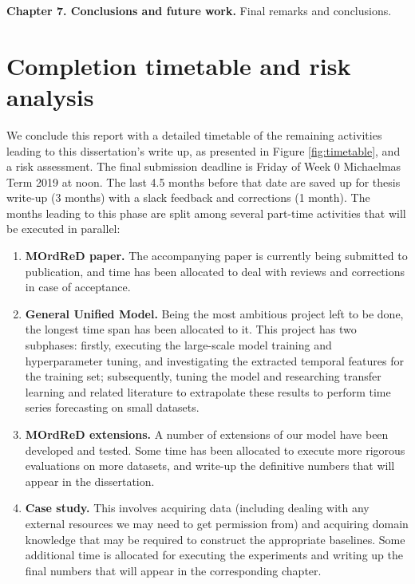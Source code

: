 \documentclass[pdftex,12pt,a4paper]{article}
\theoremstyle{definition}
\theoremstyle{remark}
\begin{document}
\textbf{Chapter 7. Conclusions and future work.} Final remarks and conclusions. 

\section{Completion timetable and risk analysis}
We conclude this report with a detailed timetable of the remaining activities leading to this dissertation's write up, as presented in Figure \ref{fig:timetable}, and a risk assessment. The final submission deadline is Friday of Week 0 Michaelmas Term 2019 at noon. The last 4.5 months before that date are saved up for thesis write-up (3 months) with a slack feedback and corrections (1 month). The months leading to this phase are split among several part-time activities that will be executed in parallel:

\begin{enumerate}
    \item \textbf{MOrdReD paper.} The accompanying paper is currently being submitted to publication, and time has been allocated to deal with reviews and corrections in case of acceptance.
    \item \textbf{General Unified Model.} Being the most ambitious project left to be done, the longest time span has been allocated to it. This project has two subphases: firstly, executing the large-scale model training and hyperparameter tuning, and investigating the extracted temporal features for the training set; subsequently, tuning the model and researching transfer learning and related literature to extrapolate these results to perform time series forecasting on small datasets.
    \item \textbf{MOrdReD extensions.} A number of extensions of our model have been developed and tested. Some time has been allocated to execute more rigorous evaluations on more datasets, and write-up the definitive numbers that will appear in the dissertation.
    \item \textbf{Case study.} This involves acquiring data (including dealing with any external resources we may need to get permission from) and acquiring domain knowledge that may be required to construct the appropriate baselines. Some additional time is allocated for executing the experiments and writing up the final numbers that will appear in the corresponding chapter.
\end{enumerate}
\end{document}
